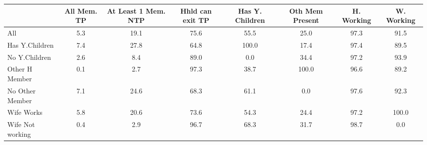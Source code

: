 \begin{tabular}{l*{7}{c}}
\hline\hline
            & All Mem. TP&At Least 1 Mem. NTP&Hhld can exit TP&Has Y. Children&Oth Mem Present&  H. Working&  W. Working\\
\hline
All         &          5.3&        19.1&        75.6&        55.5&        25.0&        97.3&        91.5\\
Has Y.Children&         7.4&        27.8&        64.8&       100.0&        17.4&        97.4&        89.5\\
No Y.Children&         2.6&         8.4&        89.0&         0.0&        34.4&        97.2&        93.9\\
Other H Member&         0.1&         2.7&        97.3&        38.7&       100.0&        96.6&        89.2\\
No Other Member&         7.1&        24.6&        68.3&        61.1&         0.0&        97.6&        92.3\\
Wife Works  &         5.8&        20.6&        73.6&        54.3&        24.4&        97.2&       100.0\\
Wife Not working&         0.4&         2.9&        96.7&        68.3&        31.7&        98.7&         0.0\\
\hline\hline
\end{tabular}
